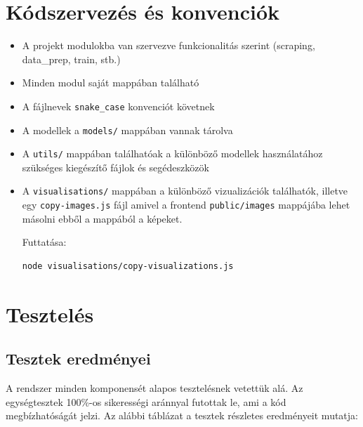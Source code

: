 \section{Kódszervezés és konvenciók}

\begin{itemize}
    \item A projekt modulokba van szervezve funkcionalitás szerint (scraping, data\_prep, train, stb.)
    \item Minden modul saját mappában található
    \item A fájlnevek \texttt{snake\_case} konvenciót követnek
    \item A modellek a \texttt{models/} mappában vannak tárolva
    \item A \texttt{utils/} mappában találhatóak a különböző modellek használatához szükséges kiegészítő fájlok és  segédeszközök
    \item A \texttt{visualisations/} mappában a különböző vizualizációk találhatók, illetve egy \texttt{copy-images.js} fájl amivel a frontend \texttt{public/images} mappájába lehet másolni ebből a mappából a képeket.
    
    Futtatása:
    \begin{lstlisting}[language=bash]
        node visualisations/copy-visualizations.js
    \end{lstlisting}
\end{itemize}


\section{Tesztelés}

\subsection{Tesztek eredményei}

A rendszer minden komponensét alapos tesztelésnek vetettük alá. Az egységtesztek 100\%-os sikerességi aránnyal futottak le, ami a kód megbízhatóságát jelzi. Az alábbi táblázat a tesztek részletes eredményeit mutatja:

